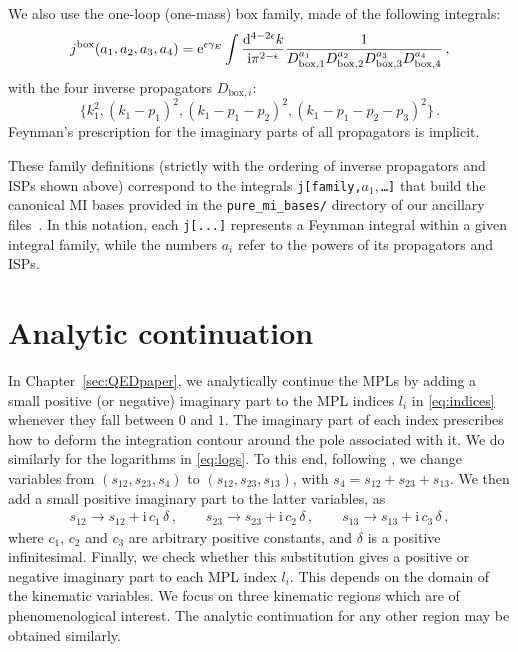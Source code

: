 \documentclass[main.tex]{subfiles}
\begin{document}
%
We also use the one-loop (one-mass) box family, made of the following integrals:
\begin{equation}
	j^{\rm box}(a_1, a_2, a_3, a_4) = \mathrm{e}^{\epsilon \gamma_{E}} \int \frac{\mathrm{d}^{4-2\epsilon} k}{\mathrm{i} \pi^{2-\epsilon}} \frac{1}{D_{\mathrm{box}, 1}^{a_1} D_{\mathrm{box},2}^{a_2} D_{\mathrm{box},3}^{a_3} D_{\mathrm{box},4}^{a_4}} \,,
\end{equation}
with the four inverse propagators $D_{\mathrm{box},i}$:
	\begin{equation}
		\big\{k_1^2, (k_1-p_1)^2, (k_1-p_1-p_2)^2, (k_1-p_1-p_2-p_3)^2 \big\} \,.
	\end{equation}
Feynman's prescription for the imaginary parts of all propagators is implicit.

These family definitions (strictly with the ordering of inverse propagators and ISPs shown above) correspond to the integrals \texttt{j[family,$a_1,$\ldots]} that build the canonical MI bases provided in the \texttt{pure\_mi\_bases/} directory of our ancillary files~\cite{zenodo}. In this notation, each \texttt{j[...]} represents a Feynman integral within a given integral family, while the numbers $a_i$ refer to the powers of its propagators and ISPs.

\renewcommand{\theequation}{G.\arabic{equation}}
\chapter{Analytic continuation} \label{app:an_cont}
In Chapter~\ref{sec:QEDpaper}, we analytically continue the MPLs by adding a small positive (or negative) imaginary part to the MPL indices $l_i$ in \cref{eq:indices} whenever they fall between $0$ and $1$. The imaginary part of each index prescribes how to deform the integration contour around the pole associated with it. We do similarly for the logarithms in \cref{eq:logs}.
To this end, following , we change variables from $(s_{12},s_{23},s_4)$ to $(s_{12},s_{23},s_{13})$, with $s_4 = s_{12} + s_{23} + s_{13}$. We then add a small positive imaginary part to the latter variables, as
\begin{align} \label{eq:add_im}
s_{12} \longrightarrow s_{12} + \mathrm{i} \, c_{1} \, \delta \, , \qquad
s_{23} \longrightarrow s_{23} + \mathrm{i} \, c_{2} \, \delta  \, , \qquad
s_{13} \longrightarrow s_{13} + \mathrm{i} \, c_{3} \, \delta  \, , 
\end{align}
where $c_{1}$, $c_{2}$ and $c_{3}$ are arbitrary positive constants, and $\delta$ is a positive infinitesimal. 
Finally, we check whether this substitution gives a positive or negative imaginary part to each MPL index $l_i$.
This depends on the domain of the kinematic variables.
We focus on three kinematic regions which are of phenomenological interest. The analytic continuation for any other region may be obtained similarly.
\end{document}
